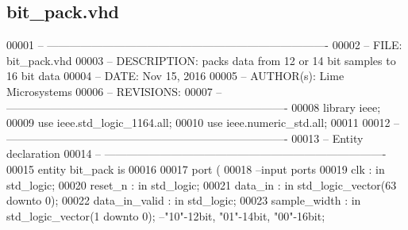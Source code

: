 \subsection{bit\+\_\+pack.\+vhd}
\label{rx__path__top_2bit__pack_2synth_2bit__pack_8vhd_source}

\begin{DoxyCode}
00001 \textcolor{keyword}{-- ----------------------------------------------------------------------------}
00002 \textcolor{keyword}{-- FILE:     bit\_pack.vhd}
00003 \textcolor{keyword}{-- DESCRIPTION:    packs data from 12 or 14 bit samples to 16 bit data}
00004 \textcolor{keyword}{-- DATE:    Nov 15, 2016}
00005 \textcolor{keyword}{-- AUTHOR(s):    Lime Microsystems}
00006 \textcolor{keyword}{-- REVISIONS:}
00007 \textcolor{keyword}{-- ----------------------------------------------------------------------------}
00008 \textcolor{vhdlkeyword}{library }\textcolor{keywordflow}{ieee};
00009 \textcolor{vhdlkeyword}{use }ieee.std\_logic\_1164.\textcolor{keywordflow}{all};
00010 \textcolor{vhdlkeyword}{use }ieee.numeric\_std.\textcolor{keywordflow}{all};
00011 
00012 \textcolor{keyword}{-- ----------------------------------------------------------------------------}
00013 \textcolor{keyword}{-- Entity declaration}
00014 \textcolor{keyword}{-- ----------------------------------------------------------------------------}
00015 \textcolor{keywordflow}{entity }bit_pack \textcolor{keywordflow}{is}
00016 
00017   \textcolor{keywordflow}{port} \textcolor{vhdlchar}{(}
00018 \textcolor{keyword}{        --input ports }
00019         \textcolor{vhdlchar}{clk}             \textcolor{vhdlchar}{:} \textcolor{keywordflow}{in} \textcolor{comment}{std\_logic};
00020         \textcolor{vhdlchar}{reset_n}         \textcolor{vhdlchar}{:} \textcolor{keywordflow}{in} \textcolor{comment}{std\_logic};
00021         \textcolor{vhdlchar}{data_in}         \textcolor{vhdlchar}{:} \textcolor{keywordflow}{in} \textcolor{comment}{std\_logic\_vector}\textcolor{vhdlchar}{(}\textcolor{vhdllogic}{}\textcolor{vhdllogic}{63} \textcolor{keywordflow}{downto} \textcolor{vhdllogic}{}\textcolor{vhdllogic}{0}\textcolor{vhdlchar}{)};
00022         \textcolor{vhdlchar}{data_in_valid}   \textcolor{vhdlchar}{:} \textcolor{keywordflow}{in} \textcolor{comment}{std\_logic};
00023         \textcolor{vhdlchar}{sample_width}    \textcolor{vhdlchar}{:} \textcolor{keywordflow}{in} \textcolor{comment}{std\_logic\_vector}\textcolor{vhdlchar}{(}\textcolor{vhdllogic}{}\textcolor{vhdllogic}{1} \textcolor{keywordflow}{downto} \textcolor{vhdllogic}{}\textcolor{vhdllogic}{0}\textcolor{vhdlchar}{)};\textcolor{keyword}{ --"10"-12bit, "01"-14bit, "00"-16bit;}

\end{DoxyCode}
